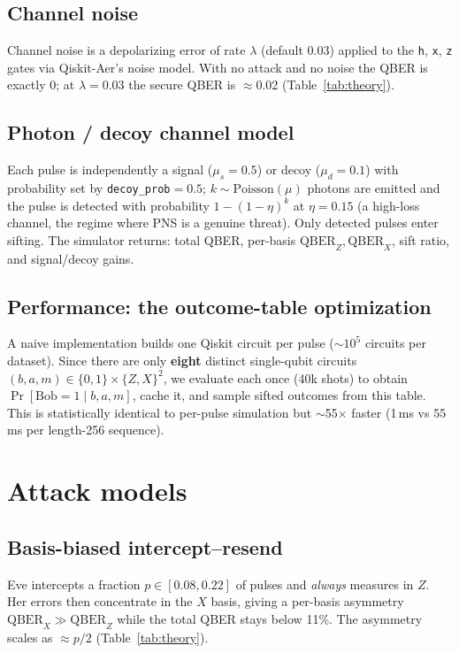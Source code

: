 \documentclass[11pt]{article}
\begin{document}
\subsection{Channel noise}
Channel noise is a depolarizing error of rate $\lambda$ (default $0.03$) applied to
the \texttt{h}, \texttt{x}, \texttt{z} gates via Qiskit-Aer's noise model. With no
attack and no noise the QBER is exactly $0$; at $\lambda=0.03$ the secure QBER is
$\approx 0.02$ (Table~\ref{tab:theory}).

\subsection{Photon / decoy channel model}
Each pulse is independently a signal ($\mu_s=0.5$) or decoy ($\mu_d=0.1$) with
probability set by \texttt{decoy\_prob}$=0.5$; $k\sim\mathrm{Poisson}(\mu)$ photons
are emitted and the pulse is detected with probability $1-(1-\eta)^k$ at
$\eta=0.15$ (a high-loss channel, the regime where PNS is a genuine threat). Only
detected pulses enter sifting. The simulator returns: total QBER, per-basis
$\mathrm{QBER}_Z,\mathrm{QBER}_X$, sift ratio, and signal/decoy gains.

\subsection{Performance: the outcome-table optimization}
A naive implementation builds one Qiskit circuit per pulse ($\sim$$10^5$ circuits per
dataset). Since there are only \textbf{eight} distinct single-qubit circuits
$(b,a,m)\in\{0,1\}\times\{Z,X\}^2$, we evaluate each once (40k shots) to obtain
$\Pr[\text{Bob}=1\mid b,a,m]$, cache it, and sample sifted outcomes from this table.
This is statistically identical to per-pulse simulation but $\sim$55$\times$ faster
(1\,ms vs 55\,ms per length-256 sequence).

\section{Attack models}
\subsection{Basis-biased intercept--resend}
Eve intercepts a fraction $p\in[0.08,0.22]$ of pulses and \emph{always} measures in
$Z$. Her errors then concentrate in the $X$ basis, giving a per-basis asymmetry
$\mathrm{QBER}_X \gg \mathrm{QBER}_Z$ while the total QBER stays below 11\%. The
asymmetry scales as $\approx p/2$ (Table~\ref{tab:theory}).
\end{document}
